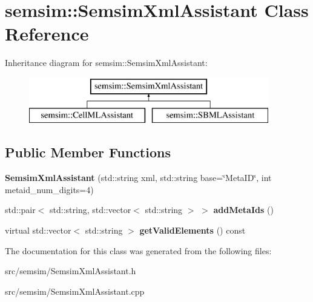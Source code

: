 \hypertarget{classsemsim_1_1SemsimXmlAssistant}{}\section{semsim\+:\+:Semsim\+Xml\+Assistant Class Reference}
\label{classsemsim_1_1SemsimXmlAssistant}
Inheritance diagram for semsim\+:\+:Semsim\+Xml\+Assistant\+:\begin{figure}[H]
\begin{center}
\leavevmode
\includegraphics[height=2.000000cm]{classsemsim_1_1SemsimXmlAssistant}
\end{center}
\end{figure}
\subsection*{Public Member Functions}
\begin{DoxyCompactItemize}
\item 
\mbox{\label{classsemsim_1_1SemsimXmlAssistant_a815b21c127616702584895612b971674}} 
{\bfseries Semsim\+Xml\+Assistant} (std\+::string xml, std\+::string base=\char`\"{}Meta\+ID\char`\"{}, int metaid\+\_\+num\+\_\+digits=4)
\item 
\mbox{\label{classsemsim_1_1SemsimXmlAssistant_a88422a4f11743c563a7ce776f4b9792a}} 
std\+::pair$<$ std\+::string, std\+::vector$<$ std\+::string $>$ $>$ {\bfseries add\+Meta\+Ids} ()
\item 
\mbox{\label{classsemsim_1_1SemsimXmlAssistant_a428ad685b04bf7d4fb0beed12714c8b1}} 
virtual std\+::vector$<$ std\+::string $>$ {\bfseries get\+Valid\+Elements} () const
\end{DoxyCompactItemize}


The documentation for this class was generated from the following files\+:\begin{DoxyCompactItemize}
\item 
src/semsim/Semsim\+Xml\+Assistant.\+h\item 
src/semsim/Semsim\+Xml\+Assistant.\+cpp\end{DoxyCompactItemize}
